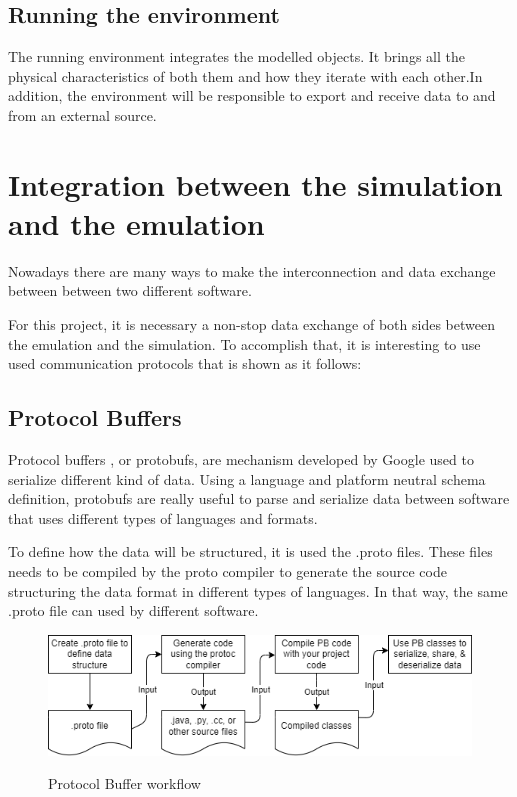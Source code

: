 \documentclass[../monografia.tex]{subfiles}
\begin{document}
\section{Running the environment}
The running environment integrates the modelled objects. It brings all the physical characteristics of both them and how they iterate with each other.In addition, the environment will be responsible to export and receive data to and from an external source.


\chapter{Integration between the simulation and the emulation}
Nowadays there are many ways to make the interconnection and data exchange between between two different software.

For this project, it is necessary  a non-stop data exchange of both sides between the emulation and the simulation. To accomplish that, it is interesting to use used communication protocols that is shown as it follows:

\section{Protocol Buffers}
Protocol buffers \cite{google_protocol_buffers}, or protobufs, are mechanism developed by Google used to serialize different kind of data. Using a  language and platform neutral schema definition, protobufs are really useful to parse and serialize data between software that uses different types of languages and formats.

To define how the data will be structured, it is used the .proto files. These files needs to be compiled by the proto compiler to generate the source code structuring the data format in different types of languages. In that way, the same .proto file can used by different software.

\begin{figure}[h]
\centering
    \caption{Protocol Buffer workflow}
    \centering %
    \includegraphics[width=14cm]{protobuf_workflow.png}
    \label{fig: protobuf_workflow}
\end{figure}
\end{document}
